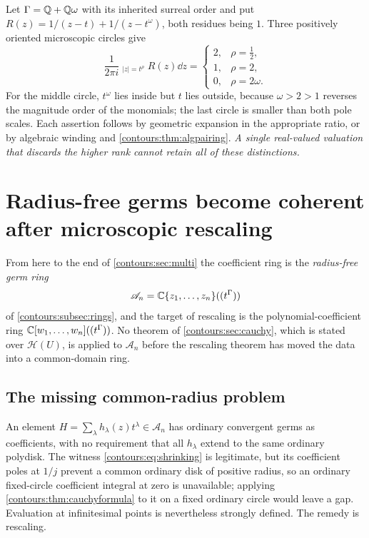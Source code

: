 \documentclass[11pt,letterpaper]{article}
\theoremstyle{definition}
\theoremstyle{remark}
\newcommand{\HH}{\mathcal H}\newcommand{\A}{\mathscr A}\newcommand{\OO}{\mathcal O}
\newcommand{\HCoint}{\mathop{\oint^{\!H}}\nolimits}
\numberwithin{equation}{section}
\begin{document}
\begin{example}
\label{contours:ex:rankcircles}
Let $\Gamma=\mathbb Q+\mathbb Q\omega$ with its inherited surreal order and put
$R(z)=1/(z-t)+1/(z-t^\omega)$, both residues being $1$. Three positively oriented
microscopic circles give
\begin{equation}\label{contours:eq:rankexample}
  \frac1{2\pi i}\HCoint_{|z|=t^\rho}R(z)\dd z=
  \begin{cases}
    2,&\rho=\tfrac12,\\
    1,&\rho=2,\\
    0,&\rho=2\omega .
  \end{cases}
\end{equation}
For the middle circle, $t^\omega$ lies inside but $t$ lies outside, because
$\omega>2>1$ reverses the magnitude order of the monomials; the last circle is
smaller than both pole scales. Each assertion follows by geometric expansion in the
appropriate ratio, or by algebraic winding and \cref{contours:thm:algpairing}.
\emph{A single real-valued valuation that discards the higher rank cannot retain all
of these distinctions.}
\end{example}

\section{Radius-free germs become coherent after microscopic rescaling}
\label{contours:sec:radiusfree}

From here to the end of \cref{contours:sec:multi} the coefficient ring is the
\emph{radius-free germ ring}
\[
  \A_n=\C\{z_1,\ldots,z_n\}((t^\Gamma))
\]
of \cref{contours:subsec:rings}, and the target of rescaling is the
polynomial-coefficient ring $\mathbb C[w_1,\ldots,w_n]((t^\Gamma))$. No theorem of
\cref{contours:sec:cauchy}, which is stated over $\HH(U)$, is applied to $\A_n$
before the rescaling theorem has moved the data into a common-domain ring.

\subsection{The missing common-radius problem}
An element $H=\sum_\lambda h_\lambda(z)t^\lambda\in\A_n$ has ordinary convergent
germs as coefficients, with no requirement that all $h_\lambda$ extend to the same
ordinary polydisk. The witness \eqref{contours:eq:shrinking} is legitimate, but its
coefficient poles at $1/j$ prevent a common ordinary disk of positive radius, so an
ordinary fixed-circle coefficient integral at zero is unavailable; applying
\cref{contours:thm:cauchyformula} to it on a fixed ordinary circle would leave a
gap. Evaluation at infinitesimal points is nevertheless strongly defined. The remedy
is rescaling.
\end{document}
